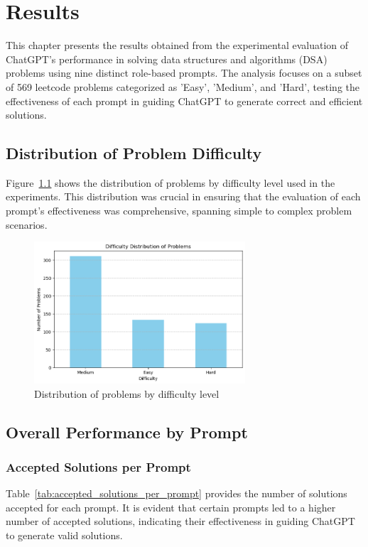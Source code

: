 \chapter{Results}
\label{ch:results}

This chapter presents the results obtained from the experimental evaluation of ChatGPT's performance in solving data structures and algorithms (DSA) problems using nine distinct role-based prompts. The analysis focuses on a subset of 569 leetcode problems categorized as 'Easy', 'Medium', and 'Hard', testing the effectiveness of each prompt in guiding ChatGPT to generate correct and efficient solutions.

\section{Distribution of Problem Difficulty}
Figure~\ref{fig:difficulty_distribution} shows the distribution of problems by difficulty level used in the experiments. This distribution was crucial in ensuring that the evaluation of each prompt's effectiveness was comprehensive, spanning simple to complex problem scenarios.

\begin{figure}[H]
    \centering
    \includegraphics[width=0.7\textwidth]{figures/difficulty_distribution.png}
    \caption{Distribution of problems by difficulty level}
    \label{fig:difficulty_distribution}
\end{figure}

\section{Overall Performance by Prompt}

\subsection{Accepted Solutions per Prompt}
Table~\ref{tab:accepted_solutions_per_prompt} provides the number of solutions accepted for each prompt. It is evident that certain prompts led to a higher number of accepted solutions, indicating their effectiveness in guiding ChatGPT to generate valid solutions.

